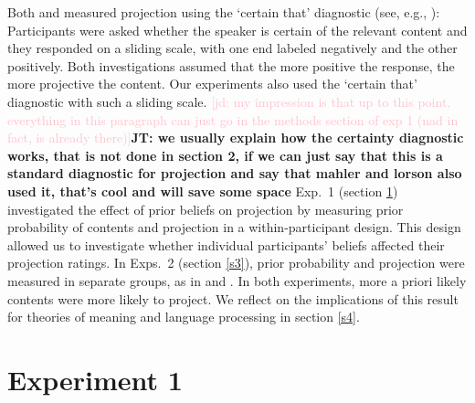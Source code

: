 \documentclass[11pt,fleqn]{article}
\newcommand{\jd}[1]{\textcolor{Pink}{[jd: #1]}}
\newcommand{\jt}[1]{\textbf{\color{blue}JT: #1}}
\newcommand{\6}{\mbox{$[\hspace*{-.6mm}[$}}
\newcommand{\9}{\mbox{$]\hspace*{-.6mm}]$}}
\begin{document}
Both  and  measured projection using the `certain that' diagnostic (see, e.g., ): Participants were asked whether the speaker is certain of the relevant content and they responded on a sliding scale, with one end  labeled negatively and the other positively. Both investigations assumed that the more positive the response, the more projective the content. Our experiments also used the `certain that' diagnostic with such a sliding scale. \jd{my impression is that up to this point, everything in this paragraph can just go in the methods section of exp 1 (nad in fact, is already there)}\jt{we usually explain how the certainty diagnostic works, that is not done in section 2, if we can just say that this is a standard diagnostic for projection and say that mahler and lorson also used it, that's cool and will save some space} Exp.~1 (section \ref{s2}) investigated the effect of prior beliefs on projection %
by measuring prior probability of contents and projection in a within-participant design. This design allowed us to investigate whether individual participants' beliefs affected their projection ratings. In Exps.~2 (section \ref{s3}), prior probability and projection were measured in separate groups, as in  and . In both experiments, more a priori likely contents were more likely to project. We reflect on the implications of this result for theories of meaning and language processing in section \ref{s4}. 



\section{Experiment 1}\label{s2}
\end{document}
